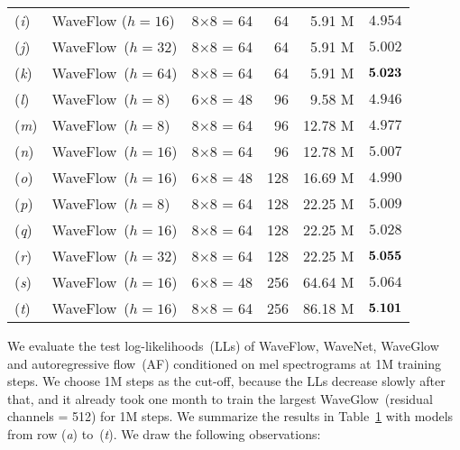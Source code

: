 \documentclass{article}
\begin{document}
\begin{table*}[t]
\begin{tabular}{l|l|r|r|r|c}
(\emph{i}) & WaveFlow ($h = 16$) & 8$\times$8 = 64  \qquad & 64 \qquad & 5.91 M \qquad &  $4.954$  \\
(\emph{j}) & WaveFlow~($h = 32$) & 8$\times$8 = 64  \qquad & 64 \qquad & 5.91 M \qquad &  $5.002$  \\
(\emph{k}) & WaveFlow~($h = 64$) & 8$\times$8 = 64  \qquad & 64 \qquad & 5.91 M \qquad &  $\bf{5.023}$   \\
(\emph{l}) & WaveFlow~($h = 8$)  & 6$\times$8 = 48  \qquad & 96 \qquad & 9.58 M \qquad &  $4.946$  \\
(\emph{m}) & WaveFlow~($h = 8$)  & 8$\times$8 = 64  \qquad & 96 \qquad & 12.78 M \qquad &  $4.977$  \\
(\emph{n}) & WaveFlow~($h = 16$)  & 8$\times$8 = 64  \qquad & 96 \qquad & 12.78 M \qquad &  $5.007$  \\
(\emph{o}) & WaveFlow~($h = 16$)     & 6$\times$8 = 48  \qquad & 128 \qquad &  16.69 M \qquad & $4.990$ \\ 
(\emph{p}) & WaveFlow~($h = 8$)     & 8$\times$8 = 64  \qquad & 128 \qquad & 22.25 M \qquad & $5.009$ \\ 
(\emph{q}) & WaveFlow~($h = 16$)    & 8$\times$8 = 64  \qquad & 128 \qquad & 22.25 M \qquad & $5.028$ \\ 
(\emph{r}) & WaveFlow~($h = 32$)    & 8$\times$8 = 64  \qquad & 128 \qquad & 22.25 M \qquad & $\bf{5.055}$ \\ 
(\emph{s}) & WaveFlow~($h = 16$)    & 6$\times$8 = 48  \qquad & 256 \qquad & 64.64 M \qquad & $5.064$  \\
(\emph{t}) & WaveFlow~($h = 16$)    & 8$\times$8 = 64  \qquad & 256 \qquad & 86.18 M  \qquad & $\bf{5.101}$  \\ \hline
\end{tabular}
\label{tab:test_likelihood}
\vspace{-.2em}
\end{table*}
We evaluate the test log-likelihoods~(LLs) of WaveFlow, WaveNet, WaveGlow  and autoregressive flow~(AF) conditioned on mel spectrograms at 1M training steps. 
We choose 1M steps as the cut-off, because the LLs decrease slowly after that, and it already took one month to train the largest WaveGlow~(residual channels = 512) for 1M steps.
We summarize the results in Table~\ref{tab:test_likelihood} with models from row (\emph{a}) to~(\emph{t}).
We draw the following observations:
\end{document}
